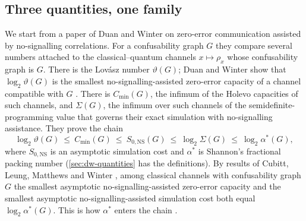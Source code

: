 \documentclass[11pt]{article}
\theoremstyle{definition}
\newcommand{\vt}{\vartheta}
\newcommand{\Cmin}{C_{\min}}
\newcommand{\SNS}{S_{0,\mathrm{NS}}}
\begin{document}
\subsection{Three quantities, one family}

We start from a paper of Duan and Winter \cite{DuanWinter2016} on zero-error
communication assisted by no-signalling correlations.  For a confusability
graph $G$ they compare several numbers attached to the classical--quantum
channels $x\mapsto\rho_x$ whose confusability graph is $G$.  There is the
Lov\'asz number $\vt(G)$; Duan and Winter show that $\log_2\vt(G)$ is the
smallest no-signalling-assisted zero-error capacity of a channel compatible
with $G$ \cite[Theorem~5]{DuanWinter2016}.  There is $\Cmin(G)$, the
infimum of the Holevo capacities of such channels, and $\Sigma(G)$, the infimum over
such channels of the semidefinite-programming value that governs their exact
simulation with no-signalling assistance.  They prove the chain
\begin{equation}\label{eq:dw-chain}
 \log_2\vt(G)\ \le\ \Cmin(G)\ \le\ \SNS(G)\ \le\ \log_2\Sigma(G)\ \le\
 \log_2\alpha^*(G),
\end{equation}
where $\SNS$ is an asymptotic simulation cost and $\alpha^*$ is Shannon's
fractional packing number \cite{Shannon1956} (\cref{sec:dw-quantities} has
the definitions).  By results of Cubitt, Leung, Matthews and Winter
\cite{CLMW2011}, among classical channels with confusability graph $G$ the
smallest asymptotic no-signalling-assisted zero-error capacity and the
smallest asymptotic no-signalling-assisted simulation cost both equal
$\log_2\alpha^*(G)$.  This is how $\alpha^*$ enters the chain
\cite[Section~V]{DuanWinter2016}.
\end{document}
